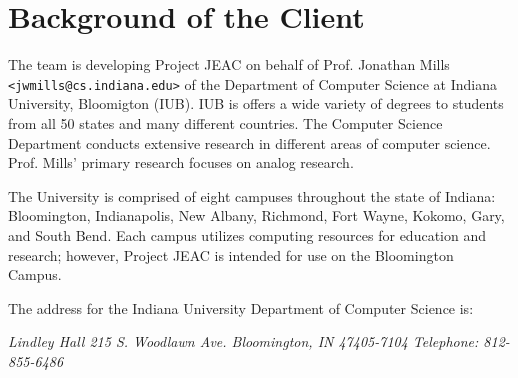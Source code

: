 \chapter{Background of the Client}

The team is developing Project JEAC on behalf of Prof. Jonathan Mills \texttt{<jwmills@cs.indiana.edu>} of the Department of Computer Science at Indiana University, Bloomigton (IUB).  IUB is offers a wide variety of degrees to students from all 50 states and many different countries.  The Computer Science Department conducts extensive research in different areas of computer science.  Prof. Mills' primary research focuses on analog research.

The University is comprised of eight campuses throughout the state of Indiana:  Bloomington, Indianapolis, New Albany, Richmond, Fort Wayne, Kokomo, Gary, and South Bend.  Each campus utilizes computing resources for education and research; however, Project JEAC is intended for use on the Bloomington Campus.  

The address for the Indiana University Department of Computer Science is:

\begin{flushleft}
\emph{ Lindley Hall 215  S. Woodlawn Ave. \newline
  Bloomington, IN 47405-7104 \newline
  Telephone: 812-855-6486 \newline}
\end{flushleft}